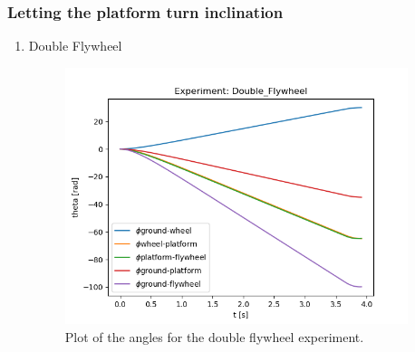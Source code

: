 \subsubsection{Letting the platform turn inclination}

\begin{enumerate}
	\item Double Flywheel
	      \begin{figure}[H]
		      \centering
		      \includegraphics[width=10cm]{img/lagrange_5/double_q.png}
		      \caption{Plot of the angles for the double flywheel experiment.}
		      \label{fig:Simulation double q}
	      \end{figure}



\end{enumerate}
